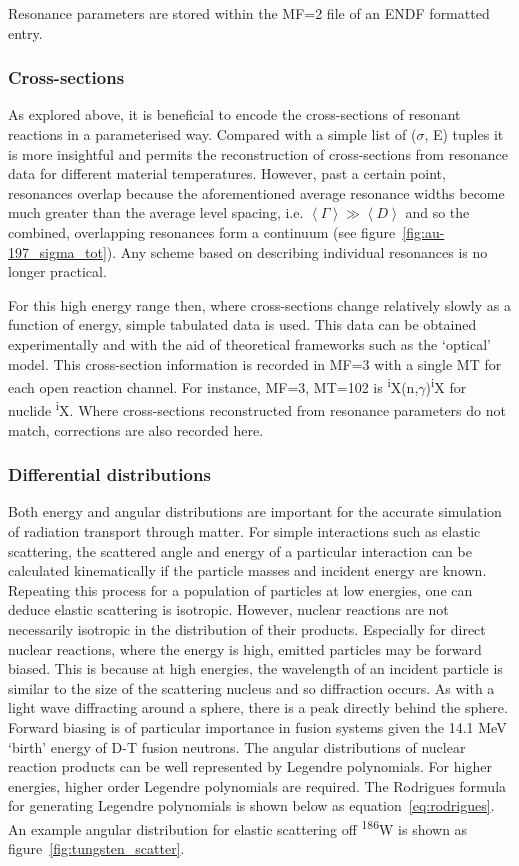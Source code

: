 Resonance parameters are stored within the MF=2 file of an ENDF formatted entry. 

\subsubsection{Cross-sections}
As explored above, it is beneficial to encode the cross-sections of resonant reactions in a parameterised way. Compared with a simple list of ($\sigma$, E) tuples it is more insightful and permits the reconstruction of cross-sections from resonance data for different material temperatures. However, past a certain point, resonances overlap because the aforementioned average resonance widths become much greater than the average level spacing, i.e. $\left<\Gamma\right> \gg \left<D\right>$ and so the combined, overlapping resonances form a continuum (see figure~\ref{fig:au-197_sigma_tot}). Any scheme based on describing individual resonances is no longer practical. 

For this high energy range then, where cross-sections change relatively slowly as a function of energy, simple tabulated data is used. This data can be obtained experimentally and with the aid of theoretical frameworks such as the `optical' model. This cross-section information is recorded in MF=3 with a single MT for each open reaction channel. For instance, MF=3, MT=102 is \textsuperscript{i}X(n,$\gamma$)\textsuperscript{i}X for nuclide \textsuperscript{i}X. Where cross-sections reconstructed from resonance parameters do not match, corrections are also recorded here.

\subsubsection{Differential distributions}
Both energy and angular distributions are important for the accurate simulation of radiation transport through matter. For simple interactions such as elastic scattering, the scattered angle and energy of a particular interaction can be calculated kinematically if the particle masses and incident energy are known. Repeating this process for a population of particles at low energies, one can deduce elastic scattering is isotropic. However, nuclear reactions are not necessarily isotropic in the distribution of their products. Especially for direct nuclear reactions, where the energy is high, emitted particles may be forward biased. This is because at high energies, the wavelength of an incident particle is similar to the size of the scattering nucleus and so diffraction occurs. As with a light wave diffracting around a sphere, there is a peak directly behind the sphere. Forward biasing is of particular importance in fusion systems given the 14.1 MeV `birth' energy of D-T fusion neutrons. The angular distributions of nuclear reaction products can be well represented by Legendre polynomials. For higher energies, higher order Legendre polynomials are required. The Rodrigues formula for generating Legendre polynomials is shown below as equation~\ref{eq:rodrigues}. An example angular distribution for elastic scattering off \textsuperscript{186}W is shown as figure~\ref{fig:tungsten_scatter}.

